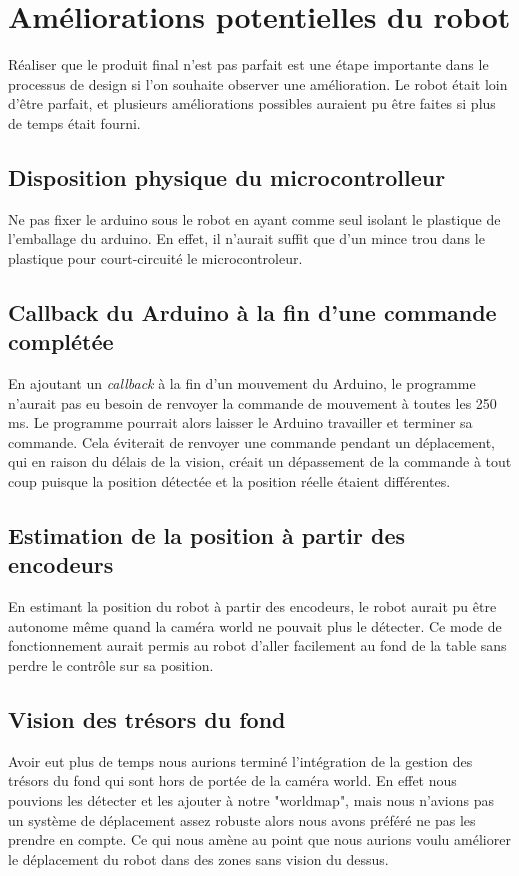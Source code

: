 \section{Améliorations potentielles du robot}

Réaliser que le produit final n'est pas parfait est une étape importante dans le processus de design si l'on souhaite observer une amélioration. Le robot était loin d'être parfait, et plusieurs améliorations possibles auraient pu être faites si plus de temps était fourni.

\subsection{Disposition physique du microcontrolleur}
Ne pas fixer le arduino sous le robot en ayant comme seul isolant le plastique de l’emballage du arduino. En effet, il n’aurait suffit que d’un mince trou dans le plastique pour court-circuité le microcontroleur.

\subsection{Callback du Arduino à la fin d’une commande complétée}
En ajoutant un \textit{callback} à la fin d’un mouvement du Arduino, le programme n’aurait pas eu besoin de renvoyer la commande de mouvement à toutes les 250 ms. Le programme pourrait alors laisser le Arduino travailler et terminer sa commande. Cela éviterait de renvoyer une commande pendant un déplacement, qui en raison du délais de la vision, créait un dépassement de la commande à tout coup puisque la position détectée et la position réelle étaient différentes.

\subsection{Estimation de la position à partir des encodeurs}
En estimant la position du robot à partir des encodeurs, le robot aurait pu être autonome même quand la caméra world ne pouvait plus le détecter. Ce mode de fonctionnement aurait permis au robot d’aller facilement au fond de la table sans perdre le contrôle sur sa position.

\subsection{Vision des trésors du fond}
Avoir eut plus de temps nous aurions terminé l'intégration de la gestion des trésors du fond qui sont hors de portée de la caméra world. En effet nous pouvions les détecter et les ajouter à notre "worldmap", mais nous n'avions pas un système de déplacement assez robuste alors nous avons préféré ne pas les prendre en compte.
Ce qui nous amène au point que nous aurions voulu améliorer le déplacement du robot dans des zones sans vision du dessus.

